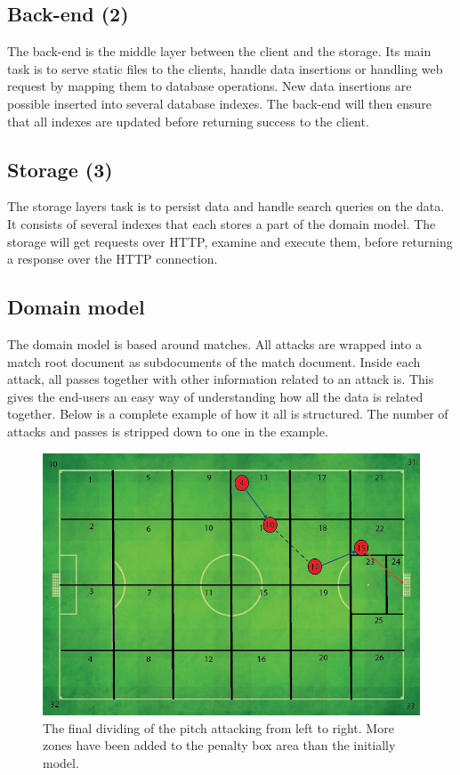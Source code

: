 \subsection{Back-end (2)}

The back-end is the middle layer between the client and the storage. Its main task is to serve static files to the clients, handle data insertions or handling web request by mapping them to database operations. New data insertions are possible inserted into several database indexes. The back-end will then ensure that all indexes are updated before returning success to the client. 

\subsection{Storage (3)}

The storage layers task is to persist data and handle search queries on the data. It consists of several indexes that each stores a part of the domain model. The storage will get requests over \ac{HTTP}, examine and execute them, before returning a response over the HTTP connection. 

\subsection{Domain model}

The domain model is based around matches. All attacks are wrapped into a match root document as subdocuments of the match document. Inside each attack, all passes together with other information related to an attack is. This gives the end-users an easy way of understanding how all the data is related together. Below is a complete example of how it all is structured. The number of attacks and passes is stripped down to one in the example.


\label{list:domainmodel}

\begin{figure}[ht!]
\centering
\includegraphics[width=1\textwidth]{images/general/capture_illustration.png}
\caption{The final dividing of the pitch attacking from left to right. More zones have been added to the penalty box area than the initially model. }
\label{fig:finalPitchDividing}
\end{figure}

